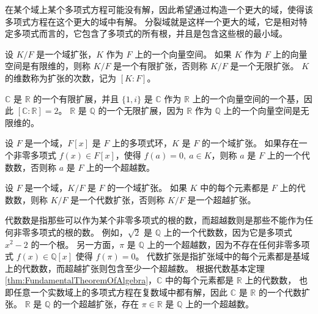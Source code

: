 \begin{note}
    在某个域上某个多项式方程可能没有解，因此希望通过构造一个更大的域，使得该多项式方程在这个更大的域中有解。
    分裂域就是这样一个更大的域，它是相对特定多项式而言的，它包含了多项式的所有根，并且是包含这些根的最小域。
\end{note}
\vspace{1em}



\begin{definition}
    设 $K/F$ 是一个域扩张，$K$ 作为 $F$ 上的一个向量空间。
    如果 $K$ 作为 $F$ 上的向量空间是有限维的，则称 $K/F$ 是一个有限扩张，否则称 $K/F$ 是一个无限扩张。
    $K$ 的维数称为扩张的次数，记为 $[K:F]$。
    \label{def:finite_infinite_extension}
\end{definition}

\begin{note}
    $\mathbb{C}$ 是 $\mathbb{R}$ 的一个有限扩展，并且 $\{1,i\}$ 是 $\mathbb{C}$ 作为 $\mathbb{R}$ 上的一个向量空间的一个基，因此 $[\mathbb{C}:\mathbb{R}]=2$。
    $\mathbb{R}$ 是 $\mathbb{Q}$ 的一个无限扩展，因为 $\mathbb{R}$ 作为 $\mathbb{Q}$ 上的一个向量空间是无限维的。
\end{note}
\vspace{1em}

\begin{definition}
    设 $F$ 是一个域，$F[x]$ 是 $F$ 上的多项式环，$K$ 是 $F$ 的一个域扩张。
    如果存在一个非零多项式 $f(x)\in F[x]$，使得 $f(a)=0,\ a\in K$，则称 $a$ 是 $F$ 上的一个代数数，否则称 $a$ 是 $F$ 上的一个超越数。
    \label{def:algebraic_transcendental}
\end{definition}

\begin{definition}
    设 $F$ 是一个域，$K/F$ 是 $F$ 的一个域扩张。
    如果 $K$ 中的每个元素都是 $F$ 上的代数数，则称 $K/F$ 是一个代数扩张，否则称 $K/F$ 是一个超越扩张。
    \label{def:algebraic_transcendental_extension}
\end{definition}

\begin{note}
    代数数是指那些可以作为某个非零多项式的根的数，而超越数则是那些不能作为任何非零多项式的根的数。
    例如，$\sqrt{2}$ 是 $\mathbb{Q}$ 上的一个代数数，因为它是多项式 $x^2 - 2$ 的一个根。
    另一方面，$\pi$ 是 $\mathbb{Q}$ 上的一个超越数，因为不存在任何非零多项式 $f(x)\in \mathbb{Q}[x]$ 使得 $f(\pi)=0$。
    代数扩张是指扩张域中的每个元素都是基域上的代数数，而超越扩张则包含至少一个超越数。
    根据代数基本定理 \ref{thm:FundamentalTheoremOfAlgebra}，$\mathbb{C}$ 中的每个元素都是 $\mathbb{R}$ 上的代数数，
    也即任意一个实数域上的多项式方程在复数域中都有解，因此 $\mathbb{C}$ 是 $\mathbb{R}$ 的一个代数扩张。
    $\mathbb{R}$ 是 $\mathbb{Q}$ 的一个超越扩张，存在 $\pi\in \mathbb{R}$ 是 $\mathbb{Q}$ 上的一个超越数。
\end{note}
\vspace{1em}

